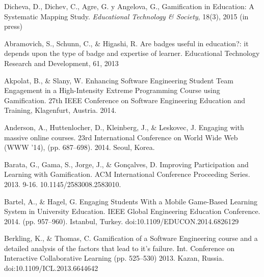 \begin{thebibliography}{9}
        Dicheva, D., Dichev, C., Agre, G. y Angelova, G.,
        Gamification in Education: A Systematic Mapping Study. {\it Educational Technology \& Society},
        18(3), 2015 (in press)

        Abramovich, S., Schunn, C., \& Higashi, R.
        Are badges useful in education?: it depends upon the type of badge and expertise of learner.
        Educational Technology Research and Development, 61, 2013

        Akpolat, B., \& Slany, W.
        Enhancing Software Engineering Student Team Engagement in a High-Intensity Extreme Programming Course using Gamification.
        27th IEEE Conference on Software Engineering Education and Training, Klagenfurt, Austria. 2014.

        Anderson, A., Huttenlocher, D., Kleinberg, J., \& Leskovec, J.
        Engaging with massive online courses.
        23rd International Conference on World Wide Web (WWW '14), (pp. 687–698). 2014. Seoul, Korea.

        Barata, G., Gama, S., Jorge, J., \& Gonçalves, D.
        Improving Participation and Learning with Gamification.
        ACM International Conference Proceeding Series. 2013. 9-16. 10.1145/2583008.2583010.

        Bartel,  A., \& Hagel,  G.
        Engaging Students With a Mobile Game-Based Learning System in University Education.
        IEEE Global Engineering Education Conference. 2014. (pp. 957–960). Istanbul, Turkey. doi:10.1109/EDUCON.2014.6826129

        Berkling, K., \& Thomas, C.
        Gamification of a Software Engineering course and a detailed analysis of the factors that lead to it's failure.
        Int. Conference on Interactive Collaborative Learning (pp. 525–530) 2013. Kazan, Russia. doi:10.1109/ICL.2013.6644642


\end{thebibliography}
